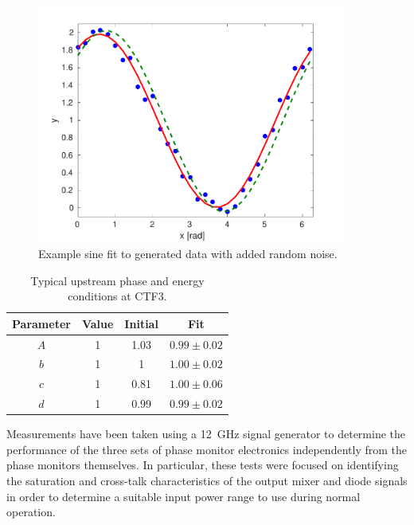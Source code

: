 \begin{figure}
  \centering
  \includegraphics[width=0.9\textwidth]{Figures/phaseMons/sinFitEx}
  \caption{Example sine fit to generated data with added random noise.}
  \label{f:sinFitEx}
\end{figure}

\begin{table}
  \begin{center}
    \begin{tabular}{|c c c c|}
	   \hline
       Parameter & Value & Initial & Fit \\ \hline
       \(A\) & 1 & 1.03 & \(0.99\pm0.02\)\\
       \(b\) & 1 & 1 & \(1.00\pm0.02\) \\
       \(c\) & 1 & 0.81 & \(1.00\pm0.06\) \\
       \(d\) & 1 & 0.99 & \(0.99\pm0.02\) \\ \hline
    \end{tabular}
    \caption{Typical upstream phase and energy conditions at CTF3.}
  	\label{t:sinFitEx}
  \end{center}
\end{table}


Measurements have been taken using a 12~GHz signal generator to determine the performance of the three sets of phase monitor electronics independently from the phase monitors themselves. In particular, these tests were focused on identifying the saturation and cross-talk characteristics of the output mixer and diode signals in order to determine a suitable input power range to use during normal operation.

